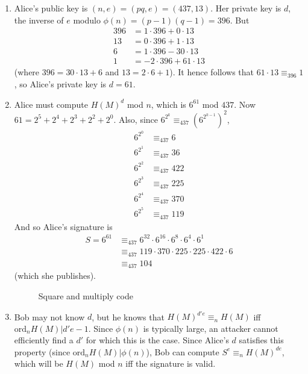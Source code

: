 \begin{enumerate}
\item Alice's public key is $(n,e)=(pq,e)=(437,13)$. Her private key is
$d$, the inverse of $e$ modulo $\phi(n)=(p-1)(q-1)=396$. But
\begin{align*}
	396 &= 1 \cdot 396 + 0 \cdot 13 \\
	13 &= 0 \cdot 396 +1 \cdot 13 \\
	6 &=  1 \cdot 396 - 30 \cdot 13 \\
	1 &= -2 \cdot 396 + 61 \cdot 13
\end{align*}
(where $396=30\cdot 13 + 6$ and $13=2 \cdot 6 + 1$). It hence
follows that $61 \cdot 13 \equiv_{396} 1$, so Alice's private key is $d=61$.

\item Alice must compute $H(M)^d$ mod  $n$, which is $6^{61}$ mod $437$.
Now $61=2^5+2^4+2^3+2^2+2^0$. Also, since $6^{2^k} \equiv_{437} \left(6^{2^{k-1}}\right)^2$,
\begin{align*}
	6^{2^0} &\equiv_{437} 6 \\
	6^{2^1} &\equiv_{437} 36 \\
	6^{2^2} &\equiv_{437} 422 \\
	6^{2^3} &\equiv_{437} 225 \\
	6^{2^4} &\equiv_{437} 370 \\
	6^{2^5} &\equiv_{437} 119
\end{align*}
And so Alice's signature is 
\begin{align*}
S=6^{61}&\equiv_{437}6^{32} \cdot 6^{16} \cdot 6^8 \cdot 6^4 \cdot 6^1 \\
&\equiv_{437} 119 \cdot 370 \cdot 225 \cdot 225 \cdot 422 \cdot 6 \\
&\equiv_{437} 104
\end{align*}
(which she publishes).

\begin{figure}
\caption{Square and multiply code}

\end{figure}

\item Bob may not know $d$, but he knows that $H(M)^{d'e} \equiv_{n} H(M)$
iff $\text{ord}_{n} H(M)|d'e-1$. Since $\phi(n)$ is typically large,
an attacker cannot efficiently find a $d'$ for which this is the case.
Since Alice's $d$ satisfies this property (since $\text{ord}_{n} H(M) |\phi(n)$),
Bob can compute $S^e \equiv_n H(M)^{de}$, which will be $H(M)$ mod $n$ iff
the signature is valid.


\end{enumerate}

